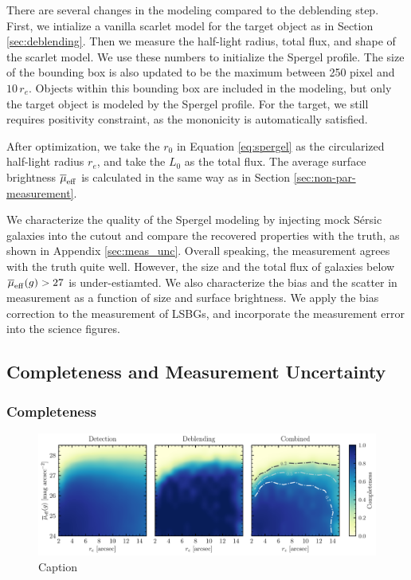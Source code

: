 \documentclass[twocolumn,astrosymb,twocolappendix]{aastex631}
\newcommand{\sersic}{S\'ersic}
\begin{document}
\begin{CJK*}{UTF8}{gbsn}
There are several changes in the modeling compared to the deblending step. First, we intialize a vanilla scarlet model for the target object as in Section \ref{sec:deblending}. Then we measure the half-light radius, total flux, and shape of the scarlet model. We use these numbers to initialize the Spergel profile. The size of the bounding box is also updated to be the maximum between 250 pixel and $10\, r_e$. Objects within this bounding box are included in the modeling, but only the target object is modeled by the Spergel profile. For the target, we still requires positivity constraint, as the mononicity is automatically satisfied. 

After optimization, we take the $r_0$ in Equation \eqref{eq:spergel} as the circularized half-light radius $r_e$, and take the $L_0$ as the total flux. The average surface brightness $\overline{\mu}_{\rm eff}$ is calculated in the same way as in Section \ref{sec:non-par-measurement}. 

We characterize the quality of the Spergel modeling by injecting mock \sersic{} galaxies into the cutout and compare the recovered properties with the truth, as shown in Appendix \ref{sec:meas_unc}. Overall speaking, the measurement agrees with the truth quite well. However, the size and the total flux of galaxies below $\overline{\mu}_{\rm eff} (g) > 27$ is under-estiamted. We also characterize the bias and the scatter in measurement as a function of size and surface brightness. We apply the bias correction to the measurement of LSBGs, and incorporate the measurement error into the science figures. 


\subsection{Completeness and Measurement Uncertainty}

\subsubsection{Completeness}\label{sec:completeness}
\begin{figure}
	\vbox{ 
		\centering
		\includegraphics[width=1\linewidth]{completeness.pdf}
	}
	\caption{Caption}
	\label{fig:completeness}
\end{figure}


\end{CJK*}
\end{document}
